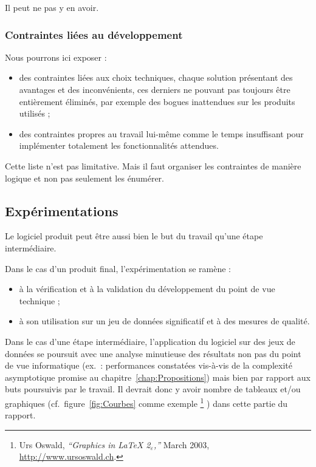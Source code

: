 \documentclass[11pt, french]{report-rd-info}
\begin{document}
Il peut ne pas y en avoir.

\subsubsection{Contraintes liées au développement}

Nous pourrons ici exposer :
\begin{itemize}
	\item des contraintes liées aux choix techniques, chaque solution présentant des avantages et des inconvénients, ces derniers ne pouvant pas toujours être entièrement éliminés, par exemple des bogues inattendues sur les produits utilisés ;
	\item des contraintes propres au travail lui-même comme le temps insuffisant pour implémenter totalement les fonctionnalités attendues.
\end{itemize}

Cette liste n'est pas limitative. Mais il faut organiser les contraintes de manière logique et non pas seulement les énumérer.

\subsection{Expérimentations}

Le logiciel produit peut être aussi bien le but du travail qu'une étape intermédiaire.

\bigskip

Dans le cas d'un produit final, l'expérimentation se ramène :
\begin{itemize}
	\item à la vérification et à la validation du développement du point de vue technique ;
	\item à son utilisation sur un jeu de données significatif et à des mesures de qualité.
\end{itemize}

\bigskip

Dans le cas d'une étape intermédiaire, l'application du logiciel sur des jeux de données se poursuit avec une analyse minutieuse des résultats non pas du point de vue informatique (ex.\ : performances constatées vis-à-vis de la complexité asymptotique promise au chapitre~\ref{chap:Propositions}) mais bien par rapport aux buts poursuivis par le travail. Il devrait donc y avoir nombre de tableaux et/ou graphiques (cf.\ figure~\ref{fig:Courbes} comme exemple%
\footnote{Urs Oswald, \emph{``Graphics in LaTeX 2$_\varepsilon$,''} March 2003, \url{http://www.ursoswald.ch}.}%
) dans cette partie du rapport.
\end{document}
